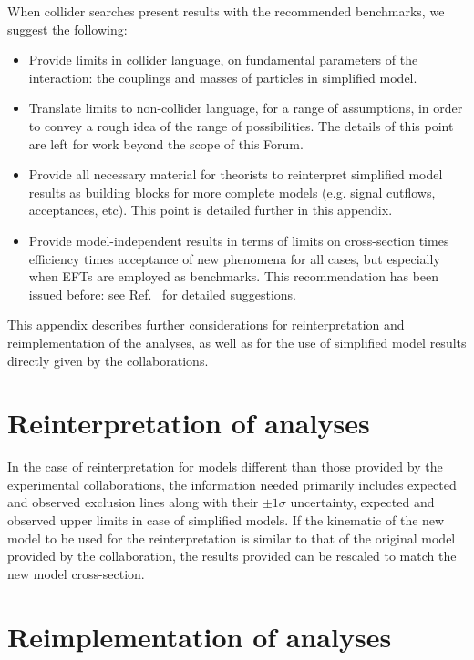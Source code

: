  When collider searches present results with the recommended benchmarks, we suggest the following:
 \begin{itemize}
 \item Provide limits in collider language, on fundamental parameters of
 the interaction: the couplings and masses of particles in simplified model.
 \item Translate limits to non-collider language, for a range of
 assumptions, in order to convey a rough idea of the range of
 possibilities. The details of this point are left for work beyond the scope of this Forum. 
 \item Provide all necessary material for theorists to reinterpret simplified
 model results as building blocks for more complete models (e.g. signal cutflows,
 acceptances, etc). This point is detailed further in this appendix.
\item Provide model-independent results in terms of limits on
  cross-section times efficiency times acceptance of new phenomena for all cases, but
  especially when EFTs are employed as benchmarks. This recommendation has been issued before: see
  Ref.~\cite{Kraml:2012sg} for detailed suggestions.
 \end{itemize}

This appendix describes further considerations for reinterpretation and reimplementation of the analyses, 
as well as for the use of simplified model results directly given by the collaborations. 

\section{Reinterpretation of analyses}

In the case of reinterpretation for models different than those provided by the experimental collaborations,
the information needed primarily includes expected and observed exclusion lines along with their $\pm 1 \sigma$ uncertainty, 
expected and observed upper limits in case of simplified models. If the kinematic
of the new model to be used for the reinterpretation is similar to that of the original model provided by the collaboration, 
the results provided can be rescaled to match the new model cross-section. 

\section{Reimplementation of analyses}

